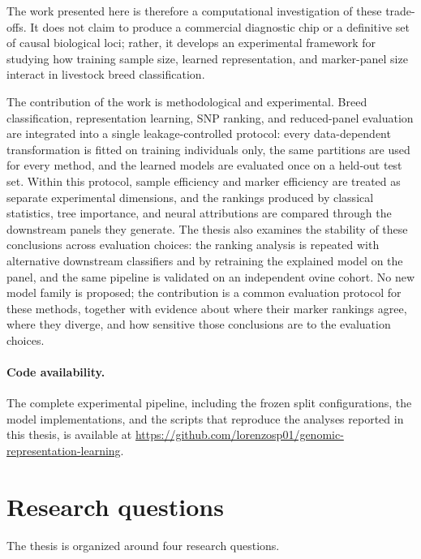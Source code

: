 The work presented here is therefore a computational investigation of
these trade-offs. It does not claim to produce a commercial diagnostic
chip or a definitive set of causal biological loci; rather, it
develops an experimental framework for studying how training sample
size, learned representation, and marker-panel size interact in
livestock breed classification.

The contribution of the work is methodological and experimental.
Breed classification, representation learning, SNP ranking, and
reduced-panel evaluation are integrated into a single leakage-controlled
protocol: every data-dependent transformation is fitted on training
individuals only, the same partitions are used for every method, and the
learned models are evaluated once on a held-out test set. Within this
protocol, sample efficiency and marker efficiency are treated as
separate experimental dimensions, and the rankings produced by
classical statistics, tree importance, and neural attributions are
compared through the downstream panels they generate. The thesis also
examines the stability of these conclusions across evaluation choices:
the ranking analysis is repeated with alternative downstream classifiers
and by retraining the explained model on the panel, and the same
pipeline is validated on an independent ovine cohort. No new model
family is proposed; the contribution is a common evaluation protocol
for these methods, together with evidence about where their marker
rankings agree, where they diverge, and how sensitive those conclusions
are to the evaluation choices.

\paragraph{Code availability.}
The complete experimental pipeline, including the frozen split
configurations, the model implementations, and the scripts that
reproduce the analyses reported in this thesis, is available at
\url{https://github.com/lorenzosp01/genomic-representation-learning}.

\section{Research questions}
\label{sec:research_questions}

The thesis is organized around four research questions.

